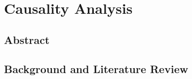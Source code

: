 \chapter{Causality Analysis}
\section{Abstract}

\section{Background and Literature Review}
\cite[p.550]{Gelfand2019HandbookStatistics}


